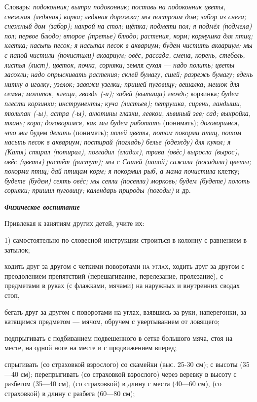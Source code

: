 \documentclass[a5paper]{book}
\renewcommand{\emph}[1]{\textit{#1}}
\begin{document}
Словарь: \emph{подоконник; вытри подоконник; поставь на подоконник
цветы, снежная (ледяная) корка; ледяная дорожка; мы построим дом; забор
из снега; снежный дом (забор); накрой на стол; щётка; подмети пол; я
подмёл (подмела) пол; первое блюдо; второе (третье) блюдо; растения,
корм; кормушка для птиц; клетка; насыпь песок; я насыпал песок в
аквариум; будем чистить аквариум; мы с папой чистили (почистили)
аквариум; овёс, рассада,} \emph{смена, корень, стебель, листья (лист),
цветок, почка, сорняки;} земля \emph{сухая} --- \emph{надо полить; цветы
засохли; надо опрыскивать растения; склей бумагу, сшей; разрежь бумагу;
вдень нитку в иголку; узелок; завяжи узелки; пришей пуговицу; вешалка;
мешок для семян; молоток, клещи, гвоздь (-и); забей (вытащи) гвоздь;}
корзинка\emph{; будем плести корзинки; инструменты; куча (листьев);
петрушка, сирень, ландыши, тюльпан (-ы), астра (-ы), анютины глазки,
левкои, львиный зев; сад; выкройка, ткань; кора; договоримся, как мы
будем работать} (понимать); \emph{договоримся, что мы} будем
\emph{делать} (понимать); \emph{полей цветы, потом покорми птиц, потом
насыпь песок в аквариум; постирай (погладь) белье (одежду) для кукол; я
(Катя) стирал (потирал), погладил (гладил),} \emph{трава (овёс) выросла
(вырос), овёс (цветы) растёт (растут); мы с Сашей (папой) сажали
(посадили) цветы; покорми птиц; дай птицам корм; я покормил рыб, а мама
почистила} клетку; \emph{будете (будем) сеять овёс; мы сеяли (посеяли)
морковь; будем (будете) полоть сорняки; пришил пуговицу; календарь
природы (погоды)} и др.

\emph{\textbf{Физическое воспитание}}

Привлекая к занятиям других детей, учите их:

1) самостоятельно по словесной инструкции строиться в колонну с
равнением в затылок;

ходить друг за другом с четкими поворотами \textsc{на углах,} ходить
друг за другом с преодолением препятствий (перешагивание, перелезание,
пролезание), с предметами в руках (с флажками, мячами) на наружных и
внутренних сводах стоп,

бегать друг за другом с поворотами на углах, взявшись за руки,
наперегонки, за катящимся предметом --- мячом, обручем с увертыванием от
ловящего;

подпрыгивать с подбиванием подвешенного в сетке большого мяча, стоя на
месте, на одной ноге на месте и с продвижением вперед;

спрыгивать (со страховкой взрослого) со скамейки \textsc{(выс. 25-}30
см); с высоты (35---40 см); перепрыгивать (со страховкой взрослого)
через веревку в высоту с разбегом (35---40 см), (со страховкой) в длину
с места (40---60 см), (со страховкой) в длину с разбега (60---80 см);
\end{document}
